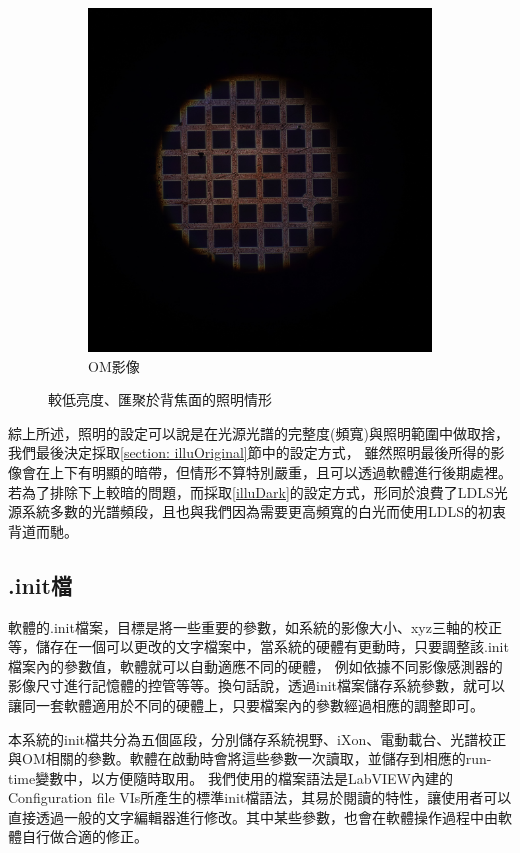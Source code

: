 \documentclass[12pt]{article}
\begin{document}
\begin{figure}
\begin{subfigure}[t]{0.45\textwidth}
        \includegraphics[width=\linewidth]{om_on_evenest.JPG}
        \caption{OM影像}
        \label{figure: evenest_on_om}
    \end{subfigure}
    \caption{較低亮度、匯聚於背焦面的照明情形}
\end{figure}

\par \noindent 綜上所述，照明的設定可以說是在光源光譜的完整度(頻寬)與照明範圍中做取捨，我們最後決定採取\ref{section: illuOriginal}節中的設定方式，
雖然照明最後所得的影像會在上下有明顯的暗帶，但情形不算特別嚴重，且可以透過軟體進行後期處裡。若為了排除下上較暗的問題，而採取\ref{illuDark}的設定方式，形同於浪費了LDLS光源系統多數的光譜頻段，且也與我們因為需要更高頻寬的白光而使用LDLS的初衷背道而馳。

\subsection{.init檔}
軟體的.init檔案，目標是將一些重要的參數，如系統的影像大小、xyz三軸的校正等，儲存在一個可以更改的文字檔案中，當系統的硬體有更動時，只要調整該.init檔案內的參數值，軟體就可以自動適應不同的硬體，
例如依據不同影像感測器的影像尺寸進行記憶體的控管等等。換句話說，透過init檔案儲存系統參數，就可以讓同一套軟體適用於不同的硬體上，只要檔案內的參數經過相應的調整即可。

本系統的init檔共分為五個區段，分別儲存系統視野、iXon、電動載台、光譜校正與OM相關的參數。軟體在啟動時會將這些參數一次讀取，並儲存到相應的run-time變數中，以方便隨時取用。
我們使用的檔案語法是LabVIEW內建的Configuration file VIs所產生的標準init檔語法，其易於閱讀的特性，讓使用者可以直接透過一般的文字編輯器進行修改。其中某些參數，也會在軟體操作過程中由軟體自行做合適的修正。
\end{document}
